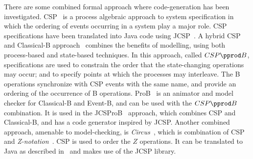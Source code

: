 There are some combined formal approach where code-generation has been investigated. CSP~\cite{HO85CSP,Roscoe1997} is a process algebraic approach to system specification in which the ordering of events occurring in a system play a major role. CSP specifications have been translated into Java code using JCSP~\cite{JCSPNet,JCSPMulti}. A hybrid CSP and Classical-B approach~\cite{SchneiderT02,SchneiderT05} combines the benefits of modelling, using both process-based and state-based techniques.  In this approach, called $CSP\pprod B$, specifications are used to constrain the order that the state-changing operations may occur; and to specify points at which the processes may interleave. The B operations synchronize with CSP events with the same name, and provide an ordering of the occurrence of B operations. ProB~\cite{LeuschelB08} is an animator and model checker for Classical-B and Event-B, and can be used with the $CSP\pprod B$ combination. It is used in the JCSProB~\cite{YangPop2007} approach, which combines CSP and Classical-B, and has a code generator inspired by JCSP. Another combined approach, amenable to model-checking, is \emph{Circus}~\cite{WoodcockC01}, which is combination of CSP and \emph{Z-notation}~\cite{Spivey89}. CSP is used to order the $Z$ operations. It can be translated to Java as described in~\cite{FreitasC06} and makes use of the JCSP library.

